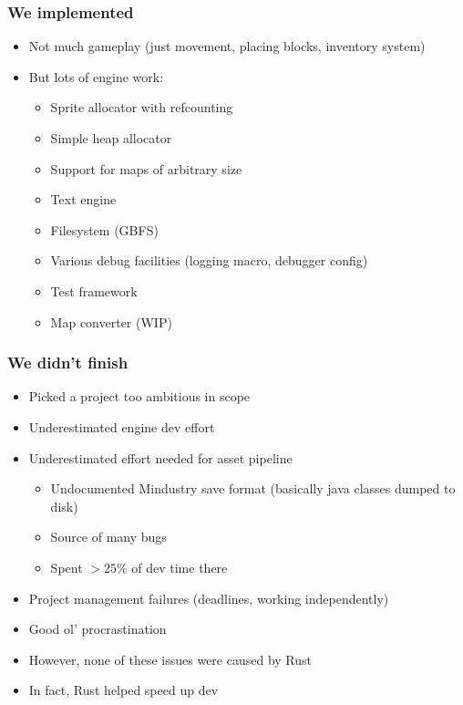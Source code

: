 \documentclass{beamer}
\begin{document}
\begin{frame}
	\frametitle{We implemented}
	\begin{itemize}
		\item Not much gameplay (just movement, placing blocks, inventory system)
		\item But lots of engine work: \begin{itemize}
			      \item Sprite allocator with refcounting
			      \item Simple heap allocator
			      \item Support for maps of arbitrary size
			      \item Text engine
			      \item Filesystem (GBFS)
			      \item Various debug facilities (logging macro, debugger config)
			      \item Test framework
			      \item Map converter (WIP)
		      \end{itemize}
	\end{itemize}
\end{frame}

\begin{frame}
	\frametitle{We didn't finish}
	\begin{itemize}
		\item Picked a project too ambitious in scope
		\item Underestimated engine dev effort
		\item Underestimated effort needed for asset pipeline \begin{itemize}
			      \item Undocumented Mindustry save format (basically java classes dumped to disk)
			      \item Source of many bugs
			      \item Spent $>25\%$ of dev time there
		      \end{itemize}
		\item Project management failures (deadlines, working independently)
		\item Good ol' procrastination
		\item However, none of these issues were caused by Rust
		\item In fact, Rust helped speed up dev
	\end{itemize}
\end{frame}
\end{document}
